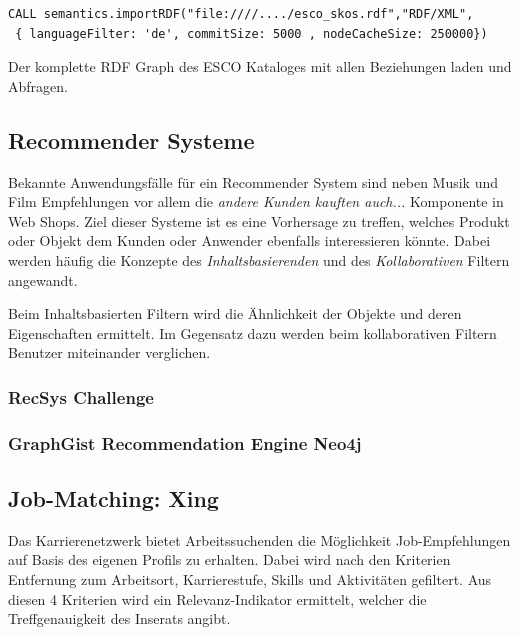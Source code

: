 \begin{lstlisting}[frame=htrbl, caption={Das Listing zeigt einen Funktionsaufruf über die Neo4j}, label={lst:result2}]
CALL semantics.importRDF("file:////..../esco_skos.rdf","RDF/XML",
 { languageFilter: 'de', commitSize: 5000 , nodeCacheSize: 250000})	
\end{lstlisting}

Der komplette RDF Graph des ESCO Kataloges mit allen Beziehungen laden und Abfragen.


\subsection{Recommender Systeme}

Bekannte Anwendungsfälle für ein Recommender System sind neben Musik und Film Empfehlungen vor allem die \textit{andere Kunden kauften auch...} Komponente in Web Shops. Ziel dieser Systeme ist es eine Vorhersage zu treffen, welches Produkt oder Objekt dem Kunden oder Anwender ebenfalls interessieren könnte. Dabei werden häufig die Konzepte des \textit{Inhaltsbasierenden} und des \textit{Kollaborativen} Filtern angewandt. 

Beim Inhaltsbasierten Filtern wird die Ähnlichkeit der Objekte und deren Eigenschaften ermittelt. Im Gegensatz dazu werden beim kollaborativen Filtern Benutzer miteinander verglichen. 

\subsubsection{RecSys Challenge}
\subsubsection{GraphGist Recommendation Engine Neo4j}

\subsection{Job-Matching: Xing}

Das Karrierenetzwerk bietet Arbeitssuchenden die Möglichkeit Job-Empfehlungen auf Basis des eigenen Profils zu erhalten. Dabei wird nach den Kriterien Entfernung zum Arbeitsort, Karrierestufe, Skills und Aktivitäten gefiltert. Aus diesen 4 Kriterien wird ein Relevanz-Indikator ermittelt, welcher die Treffgenauigkeit des Inserats angibt. 

